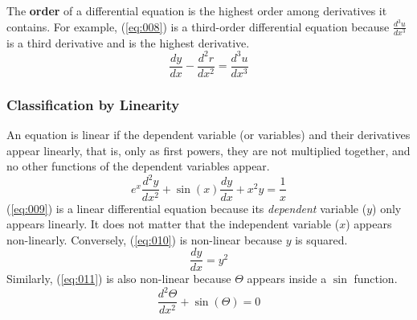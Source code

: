 \documentclass[12pt]{article}
\begin{document}
The \textbf{order} of a differential equation is the highest order among derivatives it contains. For example, (\ref{eq:008}) is a third-order differential equation because $\frac{d^3u}{dx^3}$ is a third derivative and is the highest derivative.
\begin{equation}
  \frac{dy}{dx} - \frac{d^2r}{dx^2} = \frac{d^3u}{dx^3}
  \label{eq:008}
\end{equation}

\subsubsection{Classification by Linearity}
\label{sssec:classificationByLinearity}

An equation is linear if the dependent variable (or variables) and their derivatives appear linearly, that is, only as first powers, they are not multiplied together, and no other functions of the dependent variables appear.
\begin{equation}
  e^x \frac{d^2y}{dx^2} + \sin(x) \frac{dy}{dx} + x^2y = \frac{1}{x}
  \label{eq:009}
\end{equation}
(\ref{eq:009}) is a linear differential equation because its \textit{dependent} variable ($y$) only appears linearly. It does not matter that the independent variable ($x$) appears non-linearly. Conversely, (\ref{eq:010}) is non-linear because $y$ is squared.
\begin{equation}
  \frac{dy}{dx} = y^2
  \label{eq:010}
\end{equation}
Similarly, (\ref{eq:011}) is also non-linear because $\Theta$ appears inside a $\sin$ function.
\begin{equation}
  \frac{d^2\Theta}{dx^2} + \sin(\Theta) = 0
  \label{eq:011}
\end{equation}
\end{document}
